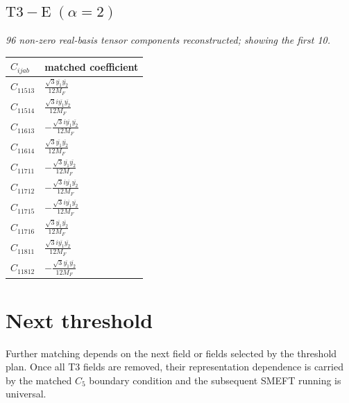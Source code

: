 \documentclass[9pt]{article}
\begin{document}
\subsection*{$ \mathrm{T3-E}\;(\alpha=2) $}
\textit{96 non-zero real-basis tensor components reconstructed; showing the first 10.}
\begin{longtable}{@{}ll@{}}
\toprule
$C_{ijab}$ & matched coefficient \\
\midrule
$C_{11513}$ & $ \frac{\sqrt{3} \overline{y_{1}} \overline{y_{2}}}{12 M_F} $ \\
$C_{11514}$ & $ \frac{\sqrt{3} i \overline{y_{1}} \overline{y_{2}}}{12 M_F} $ \\
$C_{11613}$ & $ - \frac{\sqrt{3} i \overline{y_{1}} \overline{y_{2}}}{12 M_F} $ \\
$C_{11614}$ & $ \frac{\sqrt{3} \overline{y_{1}} \overline{y_{2}}}{12 M_F} $ \\
$C_{11711}$ & $ - \frac{\sqrt{3} \overline{y_{1}} \overline{y_{2}}}{12 M_F} $ \\
$C_{11712}$ & $ - \frac{\sqrt{3} i \overline{y_{1}} \overline{y_{2}}}{12 M_F} $ \\
$C_{11715}$ & $ - \frac{\sqrt{3} i \overline{y_{1}} \overline{y_{2}}}{12 M_F} $ \\
$C_{11716}$ & $ \frac{\sqrt{3} \overline{y_{1}} \overline{y_{2}}}{12 M_F} $ \\
$C_{11811}$ & $ \frac{\sqrt{3} i \overline{y_{1}} \overline{y_{2}}}{12 M_F} $ \\
$C_{11812}$ & $ - \frac{\sqrt{3} \overline{y_{1}} \overline{y_{2}}}{12 M_F} $ \\
\bottomrule
\end{longtable}
\section*{Next threshold}
Further matching depends on the next field or fields selected by the threshold plan.  Once all T3 fields are removed, their representation dependence is carried by the matched $C_5$ boundary condition and the subsequent SMEFT running is universal.
\end{document}
